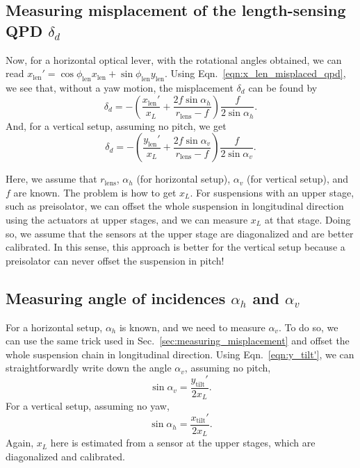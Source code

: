 \subsection{Measuring misplacement of the length-sensing QPD $\delta_d$ \label{sec:measuring_misplacement}}
Now, for a horizontal optical lever, with the rotational angles obtained, we can read $x_\mathrm{len}'=\cos\phi_\mathrm{len}x_\mathrm{len}+\sin\phi_\mathrm{len}y_\mathrm{len}$.
Using Eqn.~\eqref{eqn:x_len_misplaced_qpd}, we see that, without a yaw motion, the misplacement $\delta_d$ can be found by
\begin{equation}
	\delta_d = -\left(\frac{x_\mathrm{len}'}{x_L}+\frac{2f\sin\alpha_h}{r_\mathrm{lens}-f}\right)\frac{f}{2\sin\alpha_h}.
\end{equation}
And, for a vertical setup, assuming no pitch, we get
\begin{equation}
	\delta_d = -\left(\frac{y_\mathrm{len}'}{x_L}+\frac{2f\sin\alpha_v}{r_\mathrm{lens}-f}\right)\frac{f}{2\sin\alpha_v}.
\end{equation}
	
Here, we assume that $r_\mathrm{lens}$, $\alpha_h$ (for horizontal setup), $\alpha_v$ (for vertical setup), and $f$ are known.
The problem is how to get $x_L$.
For suspensions with an upper stage, such as preisolator, we can offset the whole suspension in longitudinal direction using the actuators at upper stages, and we can measure $x_L$ at that stage.
Doing so, we assume that the sensors at the upper stage are diagonalized and are better calibrated.
In this sense, this approach is better for the vertical setup because a preisolator can never offset the suspension in pitch!

\subsection{Measuring angle of incidences $\alpha_h$ and $\alpha_v$}
For a horizontal setup, $\alpha_h$ is known, and we need to measure $\alpha_v$.
To do so, we can use the same trick used in Sec.~\ref{sec:measuring_misplacement} and offset the whole suspension chain in longitudinal direction.
Using Eqn.~\eqref{eqn:y_tilt'}, we can straightforwardly write down the angle $\alpha_v$, assuming no pitch,
\begin{equation}
	\sin\alpha_v = \frac{y_\mathrm{tilt}'}{2x_L}.
\end{equation}
For a vertical setup, assuming no yaw,
\begin{equation}
	\sin\alpha_h = \frac{x_\mathrm{tilt}'}{2x_L}.
\end{equation}
Again, $x_L$ here is estimated from a sensor at the upper stages, which are diagonalized and calibrated.

